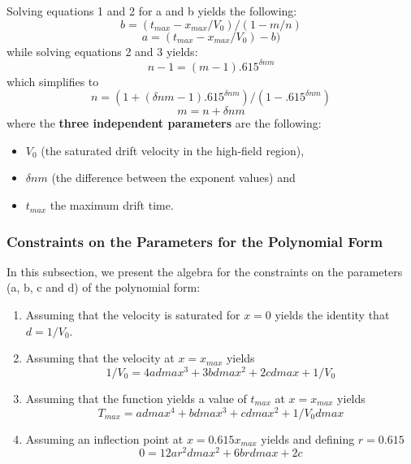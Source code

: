 \documentclass{article}
\begin{document}
Solving equations 1 and 2 for a and b yields the following:
\begin{equation}
\label{bequation}
b = (t_{max} - x_{max}/V_0) / (1 - m/n)
\end{equation}
\begin{equation}
\label{aequation}
a = (t_{max} - x_{max}/V_0) - b)
\end{equation}
while solving equations 2 and 3 yields:
\begin{equation}
n - 1 = (m - 1) .615^{\delta nm}
\end{equation}
which simplifies to 
\begin{equation}
\label{nequation}
n = (1 + (\delta nm - 1) .615^{\delta nm}) / (1 - .615^{\delta nm})
\end{equation}
\begin{equation}
\label{mequation}
m = n + \delta nm
\end{equation}
where the {\bf three independent parameters} are the following:
\begin{itemize}
\item {\bf $V_0$} (the saturated drift velocity in the high-field region), 
\item {\bf $\delta nm$} (the difference between the exponent values) and 
\item {\bf $t_{max}$} the maximum drift time.
\end{itemize}

\subsubsection{Constraints on the Parameters for the Polynomial Form}
In this subsection, we present the algebra for the constraints on the parameters
(a, b, c and d) of the polynomial form:

\begin{enumerate}
\item Assuming that the velocity is saturated for $x = 0$ yields
the identity that $d = 1/V_0$.
\item Assuming that the velocity at $x = x_{max}$ yields
\begin{equation}
1/V_0 = 4 a dmax^3 + 3 b dmax^2 + 2 c dmax + 1/V_0 
\end{equation}
\item Assuming that the function yields a value of $t_{max}$ at $x = x_{max}$ yields
\begin{equation}
T_{max} =  a dmax^4 + b dmax^3 + c dmax^2 + 1/V_0 dmax 
\end{equation}
\item  Assuming an inflection point at $x = 0.615 x_{max}$ yields
and defining $r = 0.615$
\begin{equation}
0 =  12 a r^2 dmax^2 + 6 b r dmax + 2 c  
\end{equation}
\end{enumerate}
\end{document}
